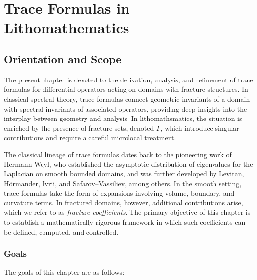 \chapter{Trace Formulas in Lithomathematics}
\label{ch:trace-formulas}

\section*{Orientation and Scope}

The present chapter is devoted to the derivation, analysis, and refinement of
trace formulas for differential operators acting on domains with fracture
structures. In classical spectral theory, trace formulas connect geometric
invariants of a domain with spectral invariants of associated operators,
providing deep insights into the interplay between geometry and analysis. 
In lithomathematics, the situation is enriched by the presence of
fracture sets, denoted $\Gamma$, which introduce singular contributions and
require a careful microlocal treatment.

The classical lineage of trace formulas dates back to the pioneering work of
Hermann Weyl, who established the asymptotic distribution of eigenvalues for
the Laplacian on smooth bounded domains, and was further developed by Levitan,
Hörmander, Ivrii, and Safarov–Vassiliev, among others. In the smooth setting,
trace formulas take the form of expansions involving volume, boundary, and
curvature terms. In fractured domains, however, additional contributions arise,
which we refer to as \emph{fracture coefficients}. The primary objective of
this chapter is to establish a mathematically rigorous framework in which such
coefficients can be defined, computed, and controlled.

\subsection*{Goals}

The goals of this chapter are as follows:

